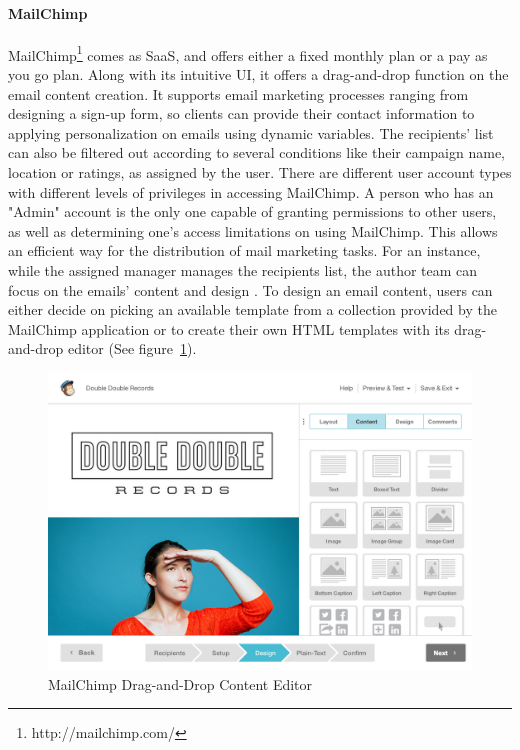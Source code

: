 \paragraph{MailChimp}
MailChimp\footnote{http://mailchimp.com/} comes as \ac{SaaS}, and offers either a fixed monthly plan or a pay as you go plan. Along with its intuitive \ac{UI}, it offers a drag-and-drop function on the email content creation. It supports email marketing processes ranging from designing a sign-up form, so clients can provide their contact information to applying personalization on emails using dynamic variables. The recipients' list can also be filtered out according to several conditions like their campaign name, location or ratings, as assigned by the user. There are different user account types with different levels of privileges in accessing MailChimp. A person who has an "Admin" account is the only one capable of granting permissions to other users, as well as determining one's access limitations on using MailChimp. This allows an efficient way for the distribution of mail marketing tasks. For an instance, while the assigned manager manages the recipients list, the author team can focus on the emails' content and design \citep{TheRocketScienceGroupLLC2013}. To design an email content, users can either decide on picking an available template from a collection provided by the MailChimp application or to create their own \ac{HTML} templates with its drag-and-drop editor (See figure~\ref{fig:MailChimp-DragAndDropEditor}).
\vspace{1cm}

\begin{figure}[H]
	\centering
	\includegraphics[width=1.00\textwidth]{imgs/MailChimp-DragAndDropEditor.jpg}
	\caption[MailChimp Drag-and-Drop Content Editor]{MailChimp Drag-and-Drop Content Editor \citep{TheRocketScienceGroupLLC2013a}}
	\label{fig:MailChimp-DragAndDropEditor}
\end{figure}


